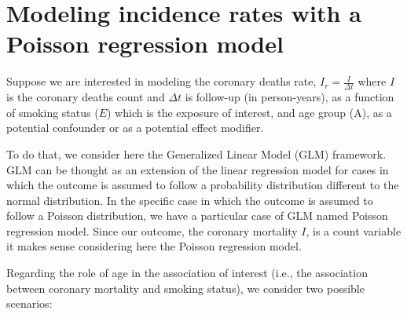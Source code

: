 \documentclass[10pt,a4paper,twoside]{article}\usepackage[]{graphicx}\usepackage[]{xcolor}
\begin{document}
\section{Modeling incidence rates with a Poisson regression model}
\label{sec:PoissonModel}

Suppose we are interested in modeling the coronary deaths rate, $I_{r} = \frac{I}{\Delta t}$ where $I$ is the coronary deaths count and $\Delta  t$ is follow-up (in person-years), as a function of smoking status ($E$) which is the exposure of interest, and age group (A), as a potential confounder or as a potential effect modifier.

To do that, we consider here the Generalized Linear Model (GLM) framework. GLM can be thought as an extension of the linear regression model for cases in which the outcome is assumed to follow a probability distribution different to the normal distribution. In the specific case in which the outcome is assumed to follow a Poisson distribution, we have a particular case of GLM named Poisson regression model. Since our outcome, the coronary mortality $I$, is a count variable  it makes sense considering here the Poisson regression model. 

Regarding the role of age in the association of interest (i.e., the association between coronary mortality and smoking status), we consider two possible scenarios:
\end{document}
